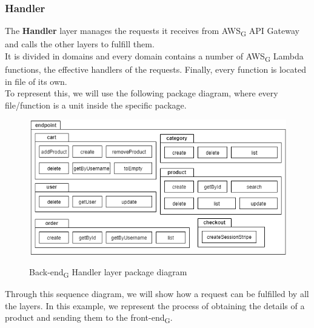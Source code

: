 \subsubsection{Handler}
The \textbf{Handler} layer manages the requests it receives from AWS\textsubscript{G} API Gateway and calls the other layers to fulfill them.\\
It is divided in domains and every domain contains a number of AWS\textsubscript{G} Lambda functions, the effective handlers of the requests. Finally, every function is located in file of its own.\\
To represent this, we will use the following package diagram, where every file/function is a unit inside the specific package.

\begin{figure}[H]
\centering
\includegraphics[scale=0.65]{res/Architettura/Backend/img/handler_package}\\
\caption{Back-end\textsubscript{G} Handler layer package diagram}
\end{figure}

Through this sequence diagram, we will show how a request can be fulfilled by all the layers. In this example, we represent the process of obtaining the details of a product and sending them to the front-end\textsubscript{G}.


